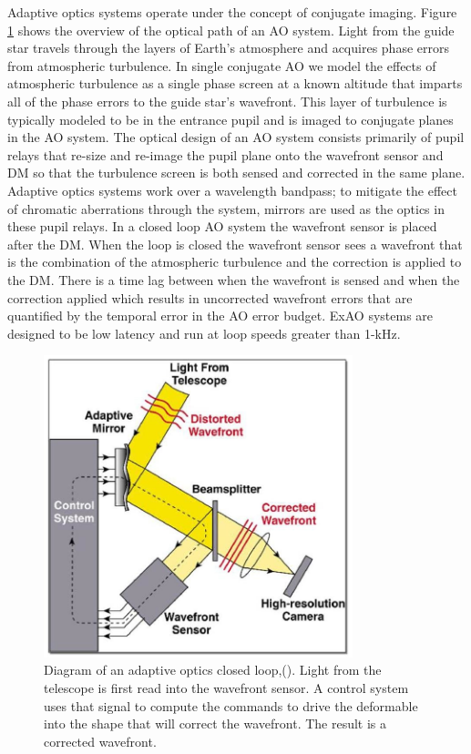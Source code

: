 Adaptive optics systems operate under the concept of conjugate imaging. Figure \ref{fig:AOdiagram} shows the overview of the optical path of an AO system. Light from the guide star travels through the layers of Earth's atmosphere and acquires phase errors from atmospheric turbulence. In single conjugate AO we model the effects of atmospheric turbulence as a single phase screen at a known altitude that imparts all of the phase errors to the guide star's wavefront. This layer of turbulence is typically modeled to be in the entrance pupil and is imaged to conjugate planes in the AO system. The optical design of an AO system consists primarily of pupil relays that re-size and re-image the pupil plane onto the wavefront sensor and DM so that the turbulence screen is both sensed and corrected in the same plane. Adaptive optics systems work over a wavelength bandpass; to mitigate the effect of chromatic aberrations through the system, mirrors are used as the optics in these pupil relays. In a closed loop AO system the wavefront sensor is placed after the DM. When the loop is closed the wavefront sensor sees a wavefront that is the combination of the atmospheric turbulence and the correction is applied to the DM. There is a time lag between when the wavefront is sensed and when the correction applied which results in uncorrected wavefront errors that are quantified by the temporal error in the AO error budget. ExAO systems are designed to be low latency and run at loop speeds greater than 1-kHz.




\begin{figure}
    \centering
    \includegraphics[width=0.8\textwidth]{Chapter Materials/Chapter Two Materials/Adaptive-Optics-System.png}
    \caption{Diagram of an adaptive optics closed loop,(\citep{suarez2017approach}). Light from the telescope is first read into the wavefront sensor. A control system uses that signal to compute the commands to drive the deformable into the shape that will correct the wavefront. The result is a corrected wavefront.}
    \label{fig:AOdiagram}
\end{figure}

